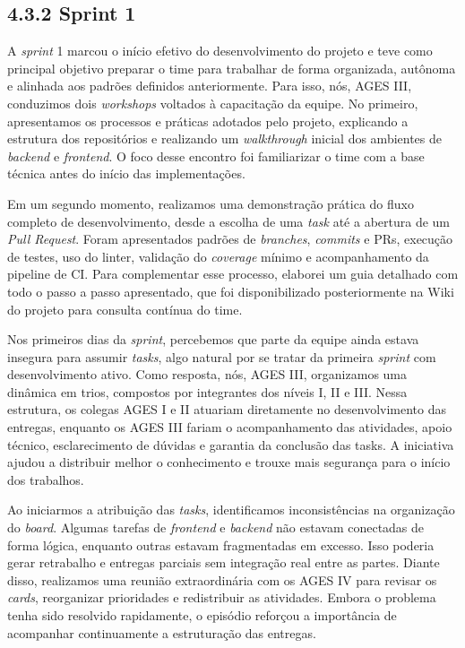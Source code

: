 \hypertarget{__RefHeading___Toc4817_3118176633}{}
\subsection*{4.3.2 Sprint 1}
\label{unit:ages-iii-sprint-1}
\indent A \textit{sprint} 1 marcou o início efetivo do desenvolvimento do projeto e teve como principal objetivo preparar o time para trabalhar de forma organizada, autônoma e alinhada aos padrões definidos anteriormente. Para isso, nós, AGES III, conduzimos dois \textit{workshops} voltados à capacitação da equipe. No primeiro, apresentamos os processos e práticas adotados pelo projeto, explicando a estrutura dos repositórios e realizando um \textit{walkthrough} inicial dos ambientes de \textit{backend} e \textit{frontend}. O foco desse encontro foi familiarizar o time com a base técnica antes do início das implementações.\par

\indent Em um segundo momento, realizamos uma demonstração prática do fluxo completo de desenvolvimento, desde a escolha de uma \textit{task} até a abertura de um \textit{Pull Request}. Foram apresentados padrões de \textit{branches}, \textit{commits} e PRs, execução de testes, uso do linter, validação do \textit{coverage} mínimo e acompanhamento da pipeline de CI. Para complementar esse processo, elaborei um guia detalhado com todo o passo a passo apresentado, que foi disponibilizado posteriormente na Wiki do projeto para consulta contínua do time.\par

\indent Nos primeiros dias da \textit{sprint}, percebemos que parte da equipe ainda estava insegura para assumir \textit{tasks}, algo natural por se tratar da primeira \textit{sprint} com desenvolvimento ativo. Como resposta, nós, AGES III, organizamos uma dinâmica em trios, compostos por integrantes dos níveis I, II e III. Nessa estrutura, os colegas AGES I e II atuariam diretamente no desenvolvimento das entregas, enquanto os AGES III fariam o acompanhamento das atividades, apoio técnico, esclarecimento de dúvidas e garantia da conclusão das tasks. A iniciativa ajudou a distribuir melhor o conhecimento e trouxe mais segurança para o início dos trabalhos.\par

\indent Ao iniciarmos a atribuição das \textit{tasks}, identificamos inconsistências na organização do \textit{board}. Algumas tarefas de \textit{frontend} e \textit{backend} não estavam conectadas de forma lógica, enquanto outras estavam fragmentadas em excesso. Isso poderia gerar retrabalho e entregas parciais sem integração real entre as partes. Diante disso, realizamos uma reunião extraordinária com os AGES IV para revisar os \textit{cards}, reorganizar prioridades e redistribuir as atividades. Embora o problema tenha sido resolvido rapidamente, o episódio reforçou a importância de acompanhar continuamente a estruturação das entregas.\par

